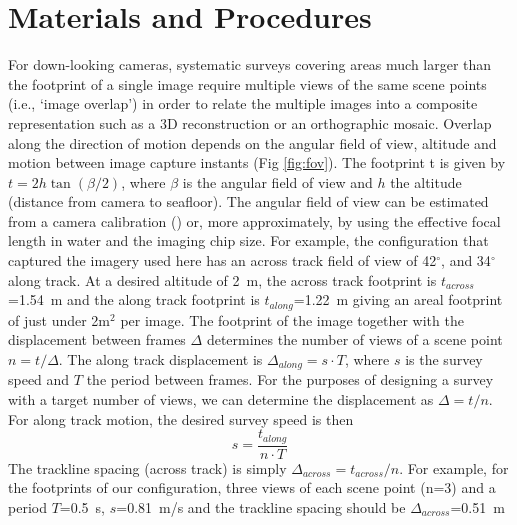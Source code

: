 \section{Materials and Procedures}
\label{sec:MandP}


For down-looking cameras, systematic surveys covering areas much larger than the footprint of a single image require multiple views of the same scene points (i.e., `image overlap') in order to relate the multiple images into a composite representation such as a 3D reconstruction or an orthographic mosaic. Overlap along the direction of motion depends on the angular field of view, altitude and motion between image capture instants (Fig \ref{fig:fov}). The footprint t is given by $t = 2 h \tan(\beta/2)$, where $\beta$ is the angular field of view and $h$ the altitude (distance from camera to seafloor). The angular field of view can be estimated from a camera calibration (\cite{bouguet2004camera}) or, more approximately, by using the effective focal length in water and the imaging chip size. For example, the configuration that captured the imagery used here has an across track field of view of 42$^\circ$, and 34$^\circ$ along track. At a desired altitude of 2~m, the across track footprint is $t_{across}$=1.54~m and the along track footprint is $t_{along}$=1.22~m giving an areal footprint of just under 2m$^2$ per image. 
The footprint of the image together with the displacement between frames $\Delta$ determines the number of views of a scene point $n = t /\Delta$. The along track displacement is $\Delta_{along} = s \cdot T$, where $s$ is the survey speed and $T$ the period between frames. 
For the purposes of designing a survey with a target number of views, we can determine the displacement as $\Delta = t/n$. For along track motion, the desired survey speed is then
\begin{equation}
s = \frac{t_{along}}{n \cdot T}
\end{equation}
The trackline spacing (across track) is simply $\Delta_{across} = t_{across}/n$.
For example, for the footprints of our configuration, three views of each scene point (n=3) and a period $T$=0.5~s, $s$=0.81~m/s and the trackline spacing should be $\Delta_{across}$=0.51~m


